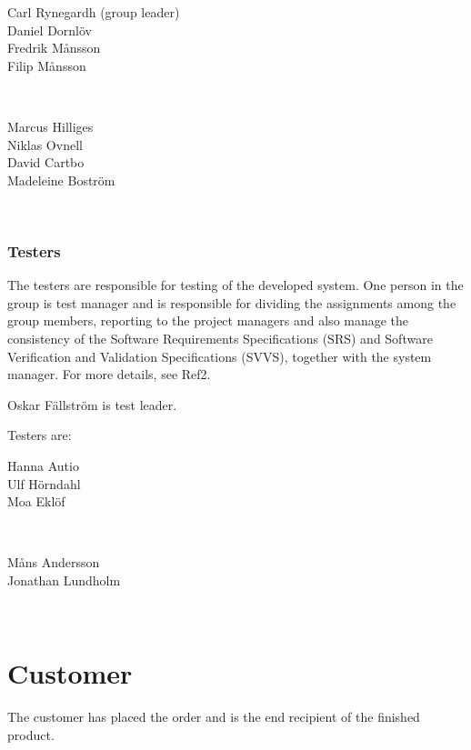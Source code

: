 \documentclass[a4paper]{article}
\begin{document}
\begin{minipage}{0.4\textwidth}
\begin{flushleft} 
Carl Rynegardh (group leader)\\
Daniel Dornlöv\\
Fredrik Månsson\\
Filip Månsson
\end{flushleft}
\end{minipage}
~
\begin{minipage}{0.3\textwidth}
\begin{flushleft}
Marcus Hilliges\\
Niklas Ovnell\\
David Cartbo\\
Madeleine Boström
\end{flushleft}
\end{minipage}\\

\subsubsection{Testers}
The testers are responsible for testing of the developed system. One person in the group is test manager and is responsible for dividing the assignments among the group members, reporting to the project managers and also manage the consistency of the Software Requirements Specifications (SRS) and Software Verification and Validation Specifications (SVVS), together with the system manager. For more details, see Ref2.

Oskar Fällström is test leader.

Testers are:

\begin{minipage}{0.4\textwidth}
\begin{flushleft} 
Hanna Autio\\
Ulf Hörndahl\\
Moa Eklöf
\end{flushleft}
\end{minipage}
~
\begin{minipage}{0.3\textwidth}
\begin{flushleft}
Måns Andersson\\
Jonathan Lundholm
\end{flushleft}
\end{minipage}\\

\section{Customer}
The customer has placed the order and is the end recipient of the finished product.
\end{document}
